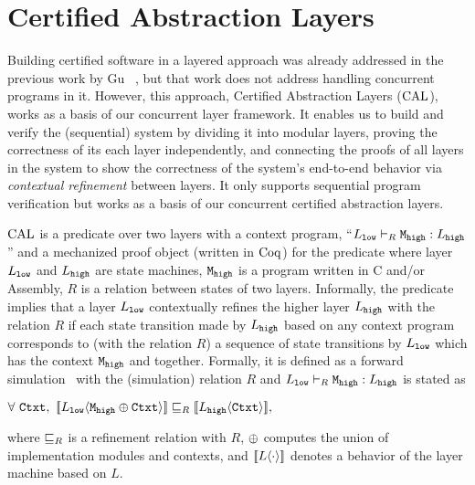 \section{Certified Abstraction Layers}
\label{chapter:ccal:sec:cal}


Building certified software in a layered approach was already addressed in the previous work by Gu \etal~\cite{deepspec},
but that work does not address handling concurrent programs in it.
However, this approach, Certified Abstraction Layers ($\mathrm{CAL}$), works as a basis of our concurrent layer framework.
It enables us to build and verify the (sequential) system by dividing it into modular layers, 
proving the correctness of its each layer independently, and connecting the proofs of all layers in the system to show the correctness of the system's end-to-end behavior via \textit{contextual refinement} between layers. 
It only supports sequential program verification but works as a basis of our concurrent certified abstraction layers.

$\mathrm{CAL}$ is a predicate over two layers with a context program, 
``$L_{{\mathrm{\texttt{low}}}} \vdash_{R} {\mathrm{\texttt{M}}}_{\mathrm{\texttt{high}}} : L_{{\mathrm{\texttt{high}}}}$'' 
and a mechanized proof object (written in $\mathrm{Coq}$) for the predicate where layer $L_{{\mathrm{\texttt{low}}}}$ and $L_{{\mathrm{\texttt{high}}}}$ are state machines, ${\mathrm{\texttt{M}}}_{\mathrm{\texttt{high}}}$ is a program written in C and/or Assembly, $R$ is a relation between states of two layers.
Informally, the predicate implies that 
a layer $L_{{\mathrm{\texttt{low}}}}$ contextually refines the higher layer $L_{{\mathrm{\texttt{high}}}}$ with the relation $R$
 if each state transition made by $L_{{\mathrm{\texttt{high}}}}$ based on any context program  
 corresponds to (with the relation $R$)  a sequence of 
 state transitions by $L_{{\mathrm{\texttt{low}}}}$ which has the context ${\mathrm{\texttt{M}}}_{{\mathrm{\texttt{high}}}}$ and   together.
 Formally, it is defined as a forward simulation~\cite{Lynch95,leroy09,Milner71,Park81} with the (simulation) relation $R$
 and  $L_{{\mathrm{\texttt{low}}}} \vdash_{R} {\mathrm{\texttt{M}}}_{{\mathrm{\texttt{high}}}}  : L_{{\mathrm{\texttt{high}}}}$ is stated as
 \begin{center}
$\forall\ \codeinmath{Ctxt},\ \sem{L_{\codeinmath{low}}}{\modulecompose{\codeinmath{M}_{\codeinmath{high}}}{\codeinmath{Ctxt}}} \refines_{R} \sem{L_{\codeinmath{high}}}{\codeinmath{Ctxt}},$
\end{center}
where $\sqsubseteq_{R}$ is a refinement relation with $R$, 
$\oplus$ computes the union 
 of implementation modules and contexts,
and $[\![{L} \langle {\cdot} \rangle]\!]$ denotes a  behavior of the layer machine based on $L$.


